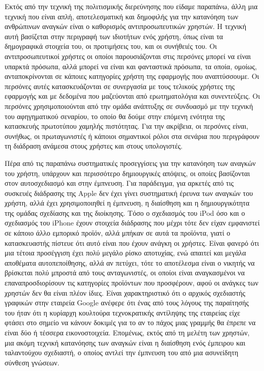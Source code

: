 \documentclass[
]{article}
\begin{document}
Εκτός από την τεχνική της πολιτισμικής διερεύνησης που είδαμε παραπάνω,
άλλη μια τεχνική που είναι απλή, αποτελεσματική και δημοφιλής για την
κατανόηση των ανθρώπινων αναγκών είναι ο καθορισμός αντιπροσωπευτικών
χρηστών. Η τεχνική αυτή βασίζεται στην περιγραφή των ιδιοτήτων ενός
χρήστη, όπως είναι τα δημογραφικά στοιχεία του, οι προτιμήσεις του, και
οι συνήθειές του. Οι αντιπροσωπευτικοί χρήστες οι οποίοι παρουσιάζονται
στις περσόνες μπορεί να είναι υπαρκτά πρόσωπα, αλλά μπορεί να είναι και
φανταστικά πρόσωπα, τα οποία, ομοίως, ανταποκρίνονται σε κάποιες
κατηγορίες χρήστη της εφαρμογής που αναπτύσσουμε. Οι περσόνες αυτές
κατασκευάζονται σε συνεργασία με τους τελικούς χρήστες της εφαρμογής και
με δεδομένα που μαζεύονται από ερωτηματολόγια και συνεντεύξεις. Οι
περσόνες χρησιμοποιούνται από την ομάδα ανάπτυξης σε συνδυασμό με την
τεχνική του αφηγηματικού σεναρίου, το οποίο θα δούμε στην επόμενη
ενότητα της κατασκευής πρωτοτύπου χαμηλής πιστότητας. Για την ακρίβεια,
οι περσόνες είναι, συνήθως, οι πρωταγωνιστές ή κάποιοι σημαντικοί ρόλοι
στα σενάρια που περιγράφουν τη διάδραση ανάμεσα στους χρήστες και στους
υπολογιστές.

Πέρα από τις παραπάνω συστηματικές προσεγγίσεις για την κατανόηση των
αναγκών του χρήστη, υπάρχουν και περισσότερο δημιουργικές απόψεις, οι
οποίες βασίζονται στον αυτοσχεδιασμό και στην έμπνευση. Για παράδειγμα,
για αρκετές από τις συσκευές διάδρασης της Apple δεν έχει γίνει
συστηματική έρευνα των αναγκών του χρήστη, αλλά έχει χρησιμοποιηθεί η
έμπνευση, η διαίσθηση και η δημιουργικότητα της ομάδας σχεδίασης και της
διοίκησης. Τόσο ο σχεδιασμός του iPod όσο και ο σχεδιασμός του iPhone
έχουν στοιχεία διάδρασης που μέχρι τότε δεν είχαν εμφανιστεί σε κάποιο
άλλο εμπορικό προϊόν, αλλά μπήκαν σε αυτά τα προϊόντα, γιατί ο
κατασκευαστής πίστευε ότι αυτό είναι που έχουν ανάγκη οι χρήστες. Είναι
φανερό ότι μια τέτοια προσέγγιση έχει πολύ μεγάλο ρίσκο αποτυχίας, ενώ
απαιτεί και μεγάλα αποθέματα αυτοπεποίθησης, αλλά αν πετύχει, τότε το
αποτέλεσμα είναι ο νικητής να βρίσκεται πολύ μπροστά από τους
ανταγωνιστές, οι οποίοι είναι αναγκασμένοι να επαναπροσδιορίσουν τις
κατηγορίες προϊόντων που προσφέρουν, αφού οι ανάγκες των χρηστών δεν θα
είναι πλέον ίδιες. Είναι χαρακτηριστικό ότι ο αρχικός σχεδιαστής
γραφικών στην εταιρεία Google ανέφερε ότι ένας από τους λόγους της
παραίτησής του ήταν ότι η κυρίαρχη κουλτούρα τεχνοκρατικής αντίληψης της
εταιρείας είχε φτάσει στο σημείο να κάνουν δοκιμές για το αν το πάχος
μιας γραμμής θα έπρεπε να είναι δύο ή τέσσερα εικονοστοιχεία. Επομένως,
εκτός από τη μελέτη των χρηστών, μια ακόμη τεχνική κατανόησης των
αναγκών είναι η διαίσθηση ενός έμπειρου και ταλαντούχου σχεδιαστή, ο
οποίος αντλεί την έμπνευση του από μια ασυνείδητη σύνθεση γνώσεων.
\end{document}

